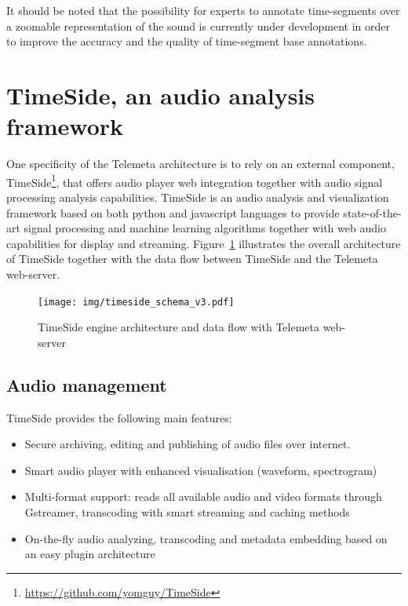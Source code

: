 \documentclass{sig-alternate}
\begin{document}
It should be noted that the possibility for experts to annotate time-segments over a zoomable representation of the sound is currently under development in order to improve the accuracy and the quality of time-segment base annotations.


\section{TimeSide, an audio analysis framework}\label{sec:TimeSide}
One specificity of the Telemeta architecture is to rely on an external component, TimeSide\footnote{\url{https://github.com/yomguy/TimeSide}}, that offers audio player web integration together with audio signal processing analysis capabilities. 
TimeSide is an audio analysis and visualization framework based on both python and javascript languages to provide state-of-the-art signal processing and machine learning algorithms together with web audio capabilities for display and streaming.
Figure~\ref{fig:TimeSide_Archi} illustrates the overall architecture of TimeSide together with the data flow between TimeSide and the Telemeta web-server.
\begin{figure}[htbp]
  \centering
  \texttt{[image: img/timeside\_schema\_v3.pdf]}
  \caption{TimeSide engine architecture and data flow with Telemeta web-server}\label{fig:TimeSide_Archi}
\end{figure}

\subsection{Audio management}
TimeSide provides the following main features:
\begin{itemize}
\item Secure archiving, editing and publishing of audio files over
  internet.
\item Smart audio player with enhanced visualisation (waveform, spectrogram)
\item Multi-format support: reads all available audio and video formats  through Gstreamer, transcoding with smart streaming and caching methods%
\item On-the-fly audio analyzing, transcoding and metadata
    embedding based on an easy plugin architecture
\end{itemize}
\end{document}
